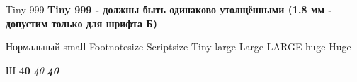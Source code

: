 \documentclass{article}
\begin{document}
	\papergraduate
	
	\tiny Tiny 999 \bfseries Tiny 999 - должны быть одинаково утолщёнными (1.8 мм - допустим только для шрифта Б)
	
	\normalfont\normalsize Нормальный	
	\small small
	\footnotesize Footnotesize	
	\scriptsize Scriptsize
	\tiny Tiny	
	\large large	
	\Large Large	
	\LARGE LARGE	
	\huge huge	
	\Huge Huge
	
	\fontsize{40mm}{68mm} Ш
	\textbf{40}
	\textsl{40}
	\textbf{\slshape 40}
	
\end{document}
